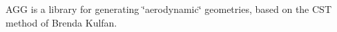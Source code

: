 A\+G\+G is a library for generating \char`\"{}aerodynamic\char`\"{} geometries, based on the C\+S\+T method of Brenda Kulfan. 